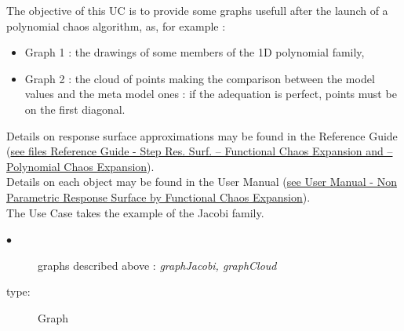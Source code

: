 \renewcommand{\filename}{docUC_RespSurface_PolyChaosDrawings.tex}
\renewcommand{\filetitle}{UC : Draw some usefull graphs associated to a polynomial chaos algorithm : polynomial graphs, comparison graph between numerical samples from the model and the meta-model, ...}

\HeaderIIILevel




The objective of this UC is to provide some graphs usefull after the launch of a polynomial chaos algorithm, as, for example :
\begin{itemize}
\item Graph 1 : the drawings of some members of the 1D polynomial family,
\item Graph 2 : the cloud of points making the comparison between the model values and the meta model ones : if the adequation is perfect, points must be on the first diagonal.
\end{itemize}


Details on response surface approximations may be found in the Reference Guide (\href{OpenTURNS_ReferenceGuide.pdf}{see files Reference Guide - Step Res. Surf. -- Functional Chaos Expansion and -- Polynomial Chaos Expansion}).\\

Details on each object may be found in the User Manual  (\href{OpenTURNS_UserManual_TUI.pdf}{see User Manual - Non Parametric Response Surface by Functional Chaos Expansion}).\\


The Use Case takes the example of the Jacobi family.\\

{
  \begin{description}
  \item[$\bullet$] graphs described above : {\itshape graphJacobi, graphCloud}
  \item[type:] Graph
  \end{description}
}



